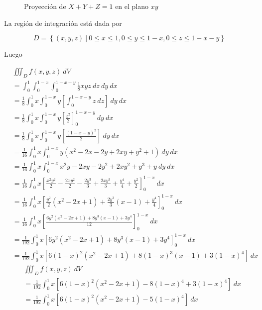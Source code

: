 \documentclass[12pt]{exam}
\begin{document}
\begin{questions}
\begin{enumerate}[(a)]
\begin{figure}[H]
\begin{tikzpicture}
      \end{tikzpicture}
      \caption{Proyección de $X+Y+Z=1$ en el plano $xy$}
    \end{figure}

    La región de integración está dada por

    \[
    D = \left\{ (x,y,z) ~|~ 0 \leq x \leq 1, 0 \leq y \leq 1-x, 0 \leq z \leq 1-x-y \right\}
    \]

    Luego

    \begin{align*}
      &\iiint_D f(x,y,z) ~ dV \\
      &= \int_0^1 \int_0^{1-x} \int_0^{1-x-y} \frac{1}{8}xyz ~ dz ~ dy ~ dx \\
      &= \frac{1}{8} \int_0^1 x \int_0^{1-x} y \left[ \int_0^{1-x-y} z ~ dz \right] ~ dy ~ dx \\
      &= \frac{1}{8} \int_0^1 x \int_0^{1-x} y \left[ \frac{z^2}{2} \right]_0^{1-x-y} ~ dy ~ dx \\
      &= \frac{1}{8} \int_0^1 x \int_0^{1-x} y \left[ \frac{(1-x-y)^2}{2} \right] ~ dy ~ dx \\
      &= \frac{1}{16} \int_0^1 x \int_0^{1-x} y (x^2-2x-2y+2xy+y^2+1) ~ dy ~ dx \\
      &= \frac{1}{16} \int_0^1 x \int_0^{1-x} x^2y-2xy-2y^2+2xy^2+y^3+y ~ dy ~ dx \\
      &= \frac{1}{16} \int_0^1 x \left[ \frac{x^2y^2}{2} - \frac{2xy^2}{2} - \frac{2y^3}{3} + \frac{2xy^3}{3} + \frac{y^4}{4} + \frac{y^2}{2} \right]_0^{1-x} ~ dx \\
      &= \frac{1}{16} \int_0^1 x \left[ \frac{y^2}{2} \left( x^2-2x+1 \right) + \frac{2y^3}{3} \left( x-1 \right) + \frac{y^4}{4} \right]_0^{1-x} ~ dx \\
      &= \frac{1}{16} \int_0^1 x \left[ \frac{6y^2 ( x^2-2x+1) + 8y^3(x-1) + 3y^4}{12} \right]_0^{1-x} ~ dx \\
      &= \frac{1}{192} \int_0^1 x \left[ 6y^2 ( x^2-2x+1) + 8y^3(x-1) + 3y^4 \right]_0^{1-x} ~ dx \\
      &= \frac{1}{192} \int_0^1 x \left[ 6(1-x)^2 ( x^2-2x+1) + 8(1-x)^3(x-1) + 3(1-x)^4 \right] ~ dx 
    \end{align*}
    \begin{align*}
      &\iiint_D f(x,y,z) ~ dV \\
      &= \frac{1}{192} \int_0^1 x \left[ 6(1-x)^2 (x^2-2x+1) - 8 (1-x)^4 + 3(1-x)^4 \right] ~ dx \\
      &= \frac{1}{192} \int_0^1 x \left[ 6(1-x)^2 (x^2-2x+1) - 5 (1-x)^4 \right] ~ dx\\

\end{align*}
\end{enumerate}
\end{questions}
\end{document}
